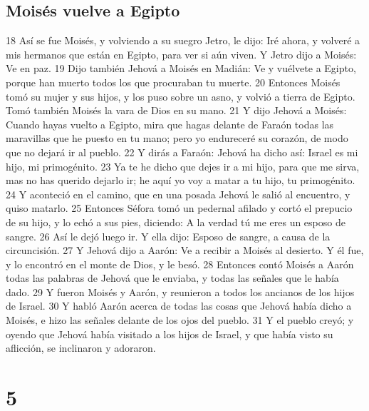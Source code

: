 \section{Moisés vuelve a Egipto}
18 Así se fue Moisés, y volviendo a su suegro Jetro, le dijo: Iré ahora, y volveré a mis hermanos que están en Egipto, para ver si aún viven. Y Jetro dijo a Moisés: Ve en paz.
19 Dijo también Jehová a Moisés en Madián: Ve y vuélvete a Egipto, porque han muerto todos los que procuraban tu muerte.
20 Entonces Moisés tomó su mujer y sus hijos, y los puso sobre un asno, y volvió a tierra de Egipto. Tomó también Moisés la vara de Dios en su mano.
21 Y dijo Jehová a Moisés: Cuando hayas vuelto a Egipto, mira que hagas delante de Faraón todas las maravillas que he puesto en tu mano; pero yo endureceré su corazón, de modo que no dejará ir al pueblo.
22 Y dirás a Faraón: Jehová ha dicho así: Israel es mi hijo, mi primogénito.
23 Ya te he dicho que dejes ir a mi hijo, para que me sirva, mas no has querido dejarlo ir; he aquí yo voy a matar a tu hijo, tu primogénito.
24 Y aconteció en el camino, que en una posada Jehová le salió al encuentro, y quiso matarlo.
25 Entonces Séfora tomó un pedernal afilado y cortó el prepucio de su hijo, y lo echó a sus pies, diciendo: A la verdad tú me eres un esposo de sangre.
26 Así le dejó luego ir. Y ella dijo: Esposo de sangre, a causa de la circuncisión.
27 Y Jehová dijo a Aarón: Ve a recibir a Moisés al desierto. Y él fue, y lo encontró en el monte de Dios, y le besó.
28 Entonces contó Moisés a Aarón todas las palabras de Jehová que le enviaba, y todas las señales que le había dado.
29 Y fueron Moisés y Aarón, y reunieron a todos los ancianos de los hijos de Israel.
30 Y habló Aarón acerca de todas las cosas que Jehová había dicho a Moisés, e hizo las señales delante de los ojos del pueblo.
31 Y el pueblo creyó; y oyendo que Jehová había visitado a los hijos de Israel, y que había visto su aflicción, se inclinaron y adoraron.

\chapter{5}

